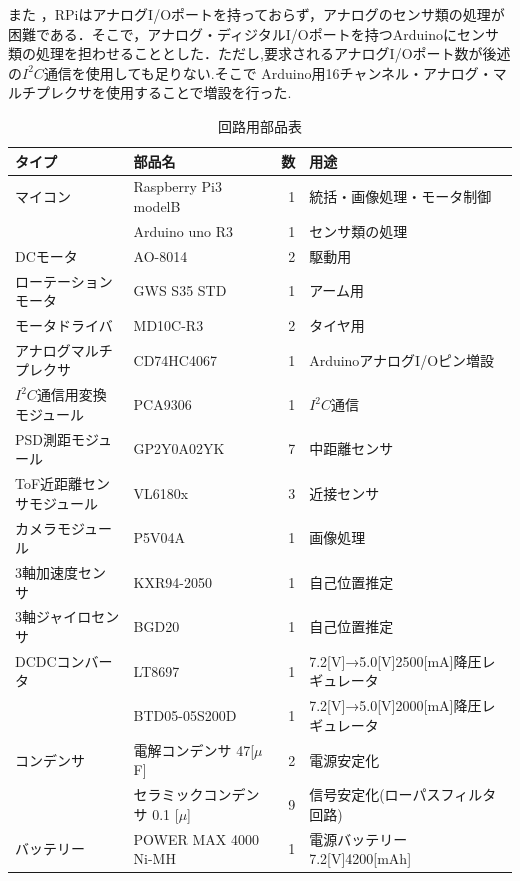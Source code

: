 \documentclass[10pt,a4j]{ujarticle}
\begin{document}
また ，RPiはアナログI/Oポートを持っておらず，アナログのセンサ類の処理が困難である．そこで，アナログ・ディジタルI/Oポートを持つArduinoにセンサ類の処理を担わせることとした．ただし,要求されるアナログI/Oポート数が後述の$I^2 C$通信を使用しても足りない.そこで
Arduino用16チャンネル・アナログ・マルチプレクサを使用することで増設を行った.
\begin{table}[h]
  \centering
  \caption{回路用部品表}
  \begin{tabular}{|l|l|r||l|} \hline
    タイプ & 部品名 & 数 & 用途 \\ \hline \hline
     マイコン & Raspberry Pi3 modelB& 1& 統括・画像処理・モータ制御 \\ \cline{2-4}
   　　& Arduino uno R3& 1 & センサ類の処理 \\ \hline
     DCモータ & AO-8014 & 2 & 駆動用 \\ \hline
     ローテーションモータ & GWS S35 STD & 1&アーム用  \\ \hline
    モータドライバ& MD10C-R3 & 2& タイヤ用 \\ \hline
   アナログマルチプレクサ & CD74HC4067 & 1 & ArduinoアナログI/Oピン増設 \\ \hline
    $I^2 C$通信用変換モジュール&PCA9306&1&$I^2 C$通信\\ \hline
     PSD測距モジュール& GP2Y0A02YK &7&中距離センサ\\ \hline
      ToF近距離センサモジュール& VL6180x&3&近接センサ \\ \hline
     カメラモジュール&P5V04A&1&画像処理\\ \hline
     3軸加速度センサ&KXR94-2050&1&自己位置推定\\ \hline
     3軸ジャイロセンサ&BGD20&1&自己位置推定\\ \hline
    DCDCコンバータ&LT8697&1& 7.2[V]→5.0[V]2500[mA]降圧レギュレータ\\ \cline{2-4}
       &BTD05-05S200D&1&7.2[V]→5.0[V]2000[mA]降圧レギュレータ\\ \hline
    コンデンサ&電解コンデンサ 47[$\mu$F]&2&電源安定化\\ \cline{2-4}
            &セラミックコンデンサ 0.1 [$\mu$]&9&信号安定化(ローパスフィルタ回路)\\ \hline
   バッテリー&POWER MAX 4000 Ni-MH&1&電源バッテリー 7.2[V]4200[mAh]\\ \hline
                 
  \end{tabular}
  \label{tab:c_parts}
\end{table}
\newpage
\end{document}

